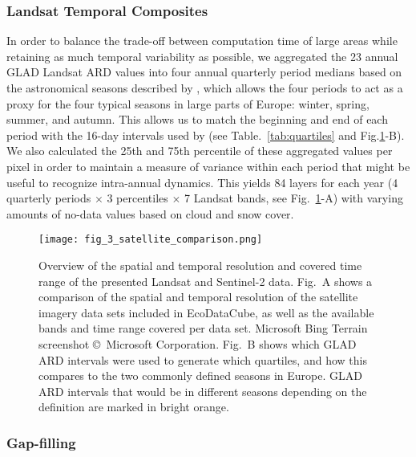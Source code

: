 \subsubsection*{Landsat Temporal Composites}
\label{sec:landsat-temporal-composites}

In order to balance the trade-off between computation time of large areas while retaining as much temporal variability as possible, we aggregated the 23 annual GLAD Landsat ARD values into four annual quarterly period medians based on the astronomical seasons described by \citet{trenberth1983seasons}, which allows the four periods to act as a proxy for the four typical seasons in large parts of Europe: winter, spring, summer, and autumn. This allows us to match the beginning and end of each period with the 16-day intervals used by \citet{potapov2020landsat} (see Table.\@~\ref{tab:quartiles} and Fig.\@\ref{fig:3_methods_satellite_comparison_and_intervals_seasons_quartiles}-B). We also calculated the 25th and 75th percentile of these aggregated values per pixel in order to maintain a measure of variance within each period that might be useful to recognize intra-annual dynamics. This yields 84 layers for each year (4 quarterly periods $\times$ 3 percentiles $\times$ 7 Landsat bands, see Fig.\@~\ref{fig:3_methods_satellite_comparison_and_intervals_seasons_quartiles}-A) with varying amounts of no-data values based on cloud and snow cover.

\begin{figure}[!hbt]
\centering
\texttt{[image: fig\_3\_satellite\_comparison.png]}
\caption{Overview of the spatial and temporal resolution and covered time range of the presented Landsat and Sentinel-2 data. Fig.\@~A shows a comparison of the spatial and temporal resolution of the satellite imagery data sets included in EcoDataCube, as well as the available bands and time range covered per data set. Microsoft Bing Terrain screenshot \copyright~Microsoft Corporation. Fig.\@~B shows which GLAD ARD intervals were used to generate which quartiles, and how this compares to the two commonly defined seasons in Europe. GLAD ARD intervals that would be in different seasons depending on the definition are marked in bright orange.}
\label{fig:3_methods_satellite_comparison_and_intervals_seasons_quartiles}
\end{figure}

\subsubsection*{Gap-filling}

